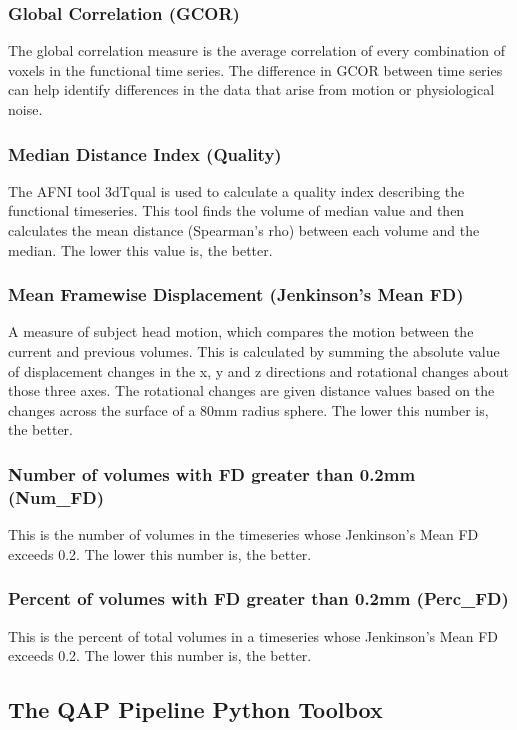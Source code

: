 \subsubsection{Global Correlation (GCOR)}
\label{sec:14}
The global correlation measure is the average correlation of every combination of voxels in the functional time series. The difference in GCOR between time series can help identify differences in the data that arise from motion or physiological noise.
\subsubsection{Median Distance Index (Quality)}
\label{sec:15}
The AFNI tool 3dTqual is used to calculate a quality index describing the functional timeseries. This tool finds the volume of median value and then calculates the mean distance (Spearman’s rho) between each volume and the median. The lower this value is, the better.
\subsubsection{Mean Framewise Displacement (Jenkinson’s Mean FD)}
\label{sec:16}
A measure of subject head motion, which compares the motion between the current and previous volumes. This is calculated by summing the absolute value of displacement changes in the x, y and z directions and rotational changes about those three axes. The rotational changes are given distance values based on the changes across the surface of a 80mm radius sphere. The lower this number is, the better.
\subsubsection{Number of volumes with FD greater than 0.2mm (Num\_FD)}
\label{sec:17}
This is the number of volumes in the timeseries whose Jenkinson’s Mean FD exceeds 0.2. The lower this number is, the better.
\subsubsection{Percent of volumes with FD greater than 0.2mm (Perc\_FD)}
\label{sec:18}
This is the percent of total volumes in a timeseries whose Jenkinson’s Mean FD exceeds 0.2. The lower this number is, the better.
\subsection{The QAP Pipeline Python Toolbox}
\label{sec:19}
